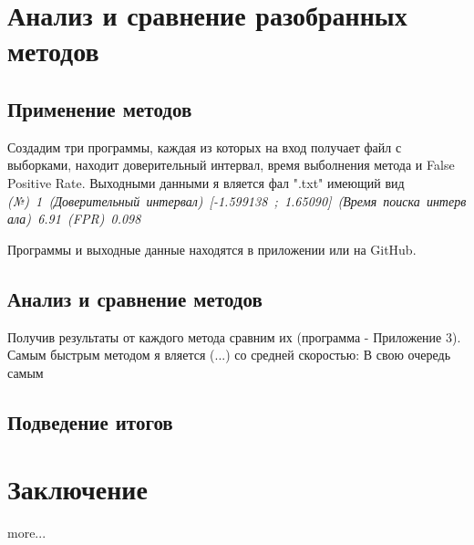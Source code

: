\documentclass[specialist,
               substylefile = spbu_report.rtx,
               subf,href,colorlinks=true, 12pt]{disser}
\begin{document}
   
\newpage
\section{Анализ и сравнение разобранных методов}
    \subsection{Применение методов}
        Создадим три программы, каждая из которых на вход получает файл с выборками, находит доверительный интервал, время выболнения метода и False Positive Rate. Выходными данными я вляется фал ".txt" имеющий вид
       \newline
       \mbox{\small{\textit{(№) 1 (Доверительный интервал) [-1.599138 ; 1.65090] (Время поиска интервала)  6.91 (FPR) 0.098}}}
        
       Программы и выходные данные находятся в приложении  или на GitHub.
    \subsection{Анализ и сравнение методов}
    Получив результаты от каждого метода сравним их (программа - Приложение 3).
    Самым быстрым методом я вляется (...) со средней скоростью:
    В свою очередь самым 
    \subsection{Подведение итогов}

\newpage
\section {Заключение}
more...
\newpage
\end{document}
